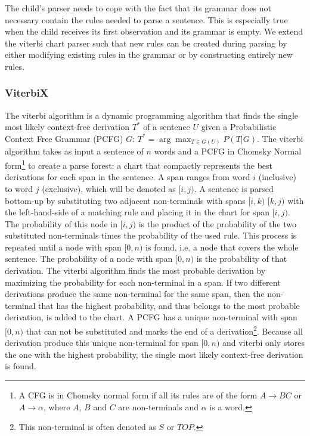\documentclass[a4paper]{article}
\begin{document}
The child's parser needs to cope with the fact that its grammar does not necessary contain the rules needed to parse a sentence. This is especially true when the child receives its first observation and its grammar is empty. We extend the viterbi chart parser such that new rules can be created during parsing by either modifying existing rules in the grammar or by constructing entirely new rules. 

\subsubsection{ViterbiX} %
The viterbi algorithm is a dynamic programming algorithm that finds the single most likely context-free derivation $T^*$ of a sentence $U$ given a Probabilistic Context Free Grammar (PCFG) $G$: $T^* = \arg \max_{T \in G(U)} P(T|G)$. The viterbi algorithm takes as input a sentence of $n$ words and a PCFG in Chomsky Normal form\footnote{A CFG is in Chomsky normal form if all its rules are of the form $A \rightarrow BC$ or $A \rightarrow \alpha$, where $A$, $B$ and $C$ are non-terminals and $\alpha$ is a word.} to create a parse forest: a chart that compactly represents the best derivations for each span in the sentence. A span ranges from word $i$ (inclusive) to word $j$ (exclusive), which will be denoted as $[i,j)$. A sentence is parsed bottom-up by substituting two adjacent non-terminals with spans $[i,k)$ $[k,j)$ with the left-hand-side of a matching rule and placing it in the chart for span $[i,j)$. The probability of this node in $[i,j)$ is the product of the probability of the two substituted non-terminals times the probability of the used rule. This process is repeated until a node with span $[0,n)$ is found, i.e. a node that covers the whole sentence. The probability of a node with span $[0,n)$ is the probability of that derivation. The viterbi algorithm finds the most probable derivation by maximizing the probability for each non-terminal in a span. If two different derivations produce the same non-terminal for the same span, then the non-terminal that has the highest probability, and thus belongs to the most probable derivation, is added to the chart. A PCFG has a unique non-terminal with span $[0,n)$ that can not be substituted and marks the end of a derivation\footnote{This non-terminal is often denoted as $S$ or $TOP$.}. Because all derivation produce this unique non-terminal for span $[0,n)$ and viterbi only stores the one with the highest probability, the single most likely context-free derivation is found. 
\end{document}
